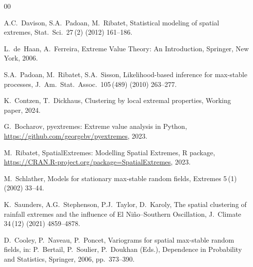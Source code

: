 \documentclass[preprint,12pt,a4paper]{elsarticle}
\begin{document}
\begin{thebibliography}{00}

A.C.~Davison, S.A.~Padoan, M.~Ribatet,
Statistical modeling of spatial extremes,
Stat.\ Sci.\ 27\,(2) (2012) 161--186.

L.~de~Haan, A.~Ferreira,
Extreme Value Theory: An Introduction,
Springer, New York, 2006.

S.A.~Padoan, M.~Ribatet, S.A.~Sisson,
Likelihood-based inference for max-stable processes,
J.\ Am.\ Stat.\ Assoc.\ 105\,(489) (2010) 263--277.

K.~Contzen, T.~Dickhaus,
Clustering by local extremal properties,
Working paper, 2024.

G.~Bocharov,
pyextremes: Extreme value analysis in Python,
\url{https://github.com/georgebv/pyextremes}, 2023.

M.~Ribatet,
SpatialExtremes: Modelling Spatial Extremes,
R package, \url{https://CRAN.R-project.org/package=SpatialExtremes}, 2023.

M.~Schlather,
Models for stationary max-stable random fields,
Extremes 5\,(1) (2002) 33--44.

K.~Saunders, A.G.~Stephenson, P.J.~Taylor, D.~Karoly,
The spatial clustering of rainfall extremes and the influence of
El Ni\~{n}o--Southern Oscillation,
J.\ Climate 34\,(12) (2021) 4859--4878.

D.~Cooley, P.~Naveau, P.~Poncet,
Variograms for spatial max-stable random fields,
in: P.~Bertail, P.~Soulier, P.~Doukhan (Eds.),
Dependence in Probability and Statistics,
Springer, 2006, pp.~373--390.

\end{thebibliography}
\end{document}

